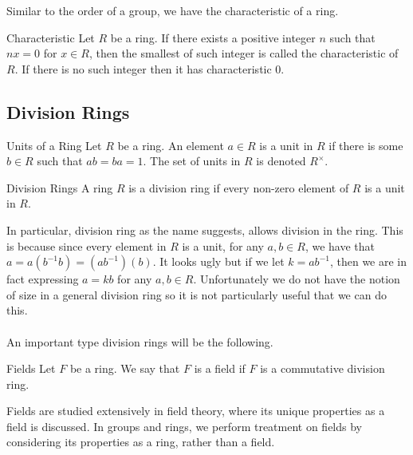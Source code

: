 \documentclass[a4paper]{article}
\begin{document}
Similar to the order of a group, we have the characteristic of a ring. 

\begin{defn}{Characteristic}{} Let $R$ be a ring. If there exists a positive integer $n$ such that $nx=0$ for $x\in R$, then the smallest of such integer is called the characteristic of $R$. If there is no such integer then it has characteristic $0$. 
\end{defn}

\subsection{Division Rings}
\begin{defn}{Units of a Ring}{} Let $R$ be a ring. An element $a\in R$ is a unit in $R$ if there is some $b\in R$ such that $ab=ba=1$. The set of units in $R$ is denoted $R^\times$. 
\end{defn}

\begin{defn}{Division Rings}{} A ring $R$ is a division ring if every non-zero element of $R$ is a unit in $R$. 
\end{defn}

In particular, division ring as the name suggests, allows division in the ring. This is because since every element in $R$ is a unit, for any $a,b\in R$, we have that $a=a(b^{-1}b)=(ab^{-1})(b)$. It looks ugly but if we let $k=ab^{-1}$, then we are in fact expressing $a=kb$ for any $a,b\in R$. Unfortunately we do not have the notion of size in a general division ring so it is not particularly useful that we can do this. \\~\\

An important type division rings will be the following. 

\begin{defn}{Fields}{} Let $F$ be a ring. We say that $F$ is a field if $F$ is a commutative division ring. 
\end{defn}

Fields are studied extensively in field theory, where its unique properties as a field is discussed. In groups and rings, we perform treatment on fields by considering its properties as a ring, rather than a field. 
\end{document}

